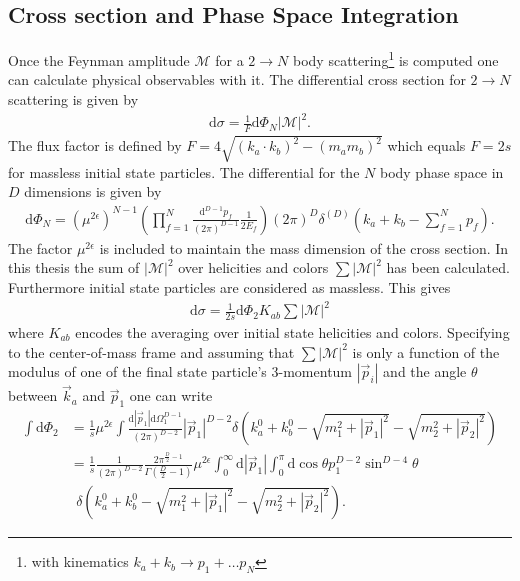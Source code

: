 \subsection{Cross section and Phase Space Integration}
Once the Feynman amplitude $\mathcal{M}$ for a $2 \to N$ body scattering\footnote{with kinematics $k_a + k_b \to p_1 + \hdots p_N$} is computed one can calculate physical observables with it. The differential cross section for $2 \to N$ scattering is given by
\begin{align}
\mbox{d}\sigma = \frac{1}{F}\mathrm{d}\Phi_N |\mathcal{M}|^2.
\end{align}
The flux factor is defined by $F = 4\sqrt{(k_a\cdot k_b)^2 - (m_am_b)^2}$ which equals $F = 2s$ for massless initial state particles. The differential for the $N$ body phase space in $D$ dimensions is given by
\begin{align}
\mathrm{d}\Phi_N = \left( \mu^{2\epsilon} \right)^{N-1} \left( \prod_{f=1}^N \frac{\mbox{d}^{D-1}p_f}{(2\pi)^{D-1}}\frac{1}{2E_f} \right)  (2\pi)^D \delta^{(D)}(k_a+k_b-\sum_{f=1}^N p_f).
\end{align} 
The factor $\mu^{2\epsilon}$ is included to maintain the mass dimension of the cross section. In this thesis the sum of $|\mathcal{M}|^2$ over helicities and colors $\sum |\mathcal{M}|^2$ has been calculated. Furthermore initial state particles are considered as massless. This gives
\begin{align}
\mathrm{d}\sigma = \frac{1}{2s} \mathrm{d}\Phi_2 K_{ab} \sum |\mathcal{M}|^2
\end{align} 
where $K_{ab}$ encodes the averaging over initial state helicities and colors. Specifying to the center-of-mass frame and assuming that $\sum|\mathcal{M}|^2$ is only a function of the modulus of one of the final state particle's 3-momentum $ |\vec{p}_i|$ and the angle $\theta$ between $\vec{k}_a$ and $\vec{p}_1$ one can write
\begin{align}
\int \mathrm{d}\Phi_2 &= \frac{1}{s} \mu^{2\epsilon} \int \frac{\mathrm{d}|\vec{p}_1|\mathrm{d}\Omega^{D-1}_1}{(2\pi)^{D-2}} |\vec{p}_1|^{D-2} \delta \left(k_a^0 + k_b^0 - \sqrt{m_1^2 + |\vec{p}_1|^2} - \sqrt{m_2^2 + |\vec{p}_2|^2} \right)\nonumber\\
&= \frac{1}{s} \frac{1}{(2\pi)^{D-2}}\frac{2\pi^{\frac{D}{2}-1}}{\Gamma(\frac{D}{2}-1)} \mu^{2\epsilon} \int_0^\infty\mathrm{d}|\vec{p}_1| \int_0^\pi \mathrm{d} \cos\theta p_1^{D-2}\sin^{D-4}\theta\nonumber\\
&\ \ \delta \left(k_a^0 + k_b^0 - \sqrt{m_1^2 + |\vec{p}_1|^2} - \sqrt{m_2^2 + |\vec{p}_2|^2} \right).\label{eq:DPhi2}
\end{align}
